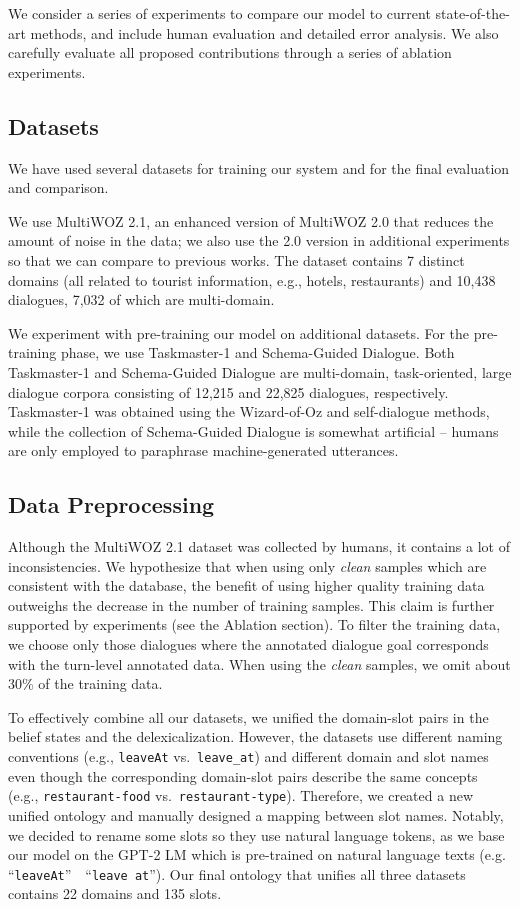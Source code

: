 \documentclass[11pt,a4paper]{article}
\newcommand{\multiwoz}[0]{MultiWOZ 2.0\xspace}
\newcommand{\multiwozn}[0]{MultiWOZ 2.1\xspace}
\newcommand{\taskmaster}[0]{Taskmaster-1\xspace}
\newcommand{\schema}[0]{Schema-Guided Dialogue\xspace}
\newcommand{\code}[1]{\texttt{#1}}
\begin{document}
We consider a series of experiments to compare our model to current state-of-the-art methods, and include human evaluation and detailed error analysis.
We also carefully evaluate all proposed contributions through a series of ablation experiments.


\subsection{Datasets}
We have used several datasets for training our system and for the final evaluation and comparison. 

We use \multiwozn, an enhanced version of \multiwoz \cite{budzianowski2018} that reduces the amount of noise in the data; we also use the 2.0 version in additional experiments so that we can compare to previous works.
The dataset contains 7 distinct domains (all related to tourist information, e.g., hotels, restaurants) and 10,438 dialogues, 7,032 of which are multi-domain.



We experiment with pre-training our model on additional datasets.
For the pre-training phase, we use \taskmaster \cite{byrne2019} and \schema \cite{rastogi2019}.
Both \taskmaster and \schema are multi-domain, task-oriented, large dialogue corpora consisting of 12,215 and 22,825 dialogues, respectively.
\taskmaster was obtained using the Wizard-of-Oz and self-dialogue methods, while the collection of \schema is somewhat artificial -- humans are only employed to paraphrase machine-generated utterances.


\subsection{Data Preprocessing}\label{sec:preprocessing}

Although the MultiWOZ 2.1 dataset was collected by humans, it contains a lot of inconsistencies. We hypothesize that when using only \textit{clean} samples which are consistent with the database, the benefit of using higher quality training data outweighs the decrease in the number of training samples. This claim is further supported by experiments (see the Ablation section). To filter the training data, we choose only those dialogues where the annotated dialogue goal corresponds with the turn-level annotated data. When using the \emph{clean} samples, we omit about 30\% of the training data.


To effectively combine all our datasets, we unified the domain-slot pairs in the belief states and the delexicalization.
However, the datasets use different naming conventions (e.g., \code{leaveAt} vs.\ \code{leave\_at}) and different domain and slot names even though the corresponding domain-slot pairs describe the same concepts (e.g., \code{restaurant-food} vs.\ \code{restaurant-type}). Therefore, we created a new unified ontology and manually designed a mapping between slot names. Notably, we decided to rename some slots so they use natural language tokens, as we base our model on the GPT-2 LM which is pre-trained on natural language texts (e.g. ``\code{leaveAt}''~~``\code{leave at}'').
Our final ontology that unifies all three datasets contains 22 domains and 135 slots. 
\end{document}

